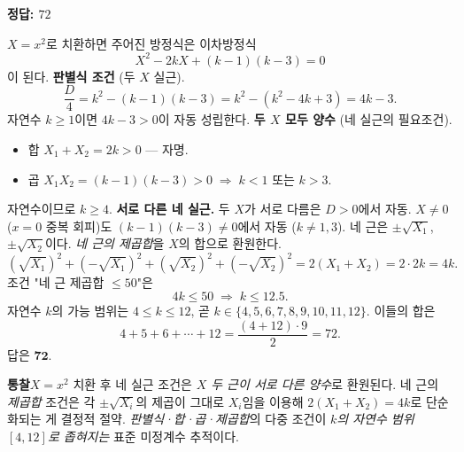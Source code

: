 \documentclass[10pt]{article}
\newcommand{\solnote}[1]{\par\smallskip\noindent
  \begin{tcolorbox}[enhanced, breakable, colback=vB-light, colframe=vB-light,
    boxrule=0pt, arc=3pt, left=10pt, right=10pt, top=4pt, bottom=4pt,
    fontupper=\sffamily\footnotesize\color{vB-ink}]
    \textbf{\color{vB-deep}통찰}\quad #1
  \end{tcolorbox}}
\begin{document}
\begin{answerbox}\sffamily\bfseries 정답: $72$\end{answerbox}
 $X = x^2$로 치환하면 주어진 방정식은 이차방정식
\[ X^2 - 2kX + (k - 1)(k - 3) = 0 \]
이 된다.
 \textbf{판별식 조건} (두 $X$ 실근).
\[ \frac{D}{4} = k^2 - (k - 1)(k - 3) = k^2 - (k^2 - 4k + 3) = 4k - 3. \]
자연수 $k \ge 1$이면 $4k - 3 > 0$이 자동 성립한다.
 \textbf{두 $X$ 모두 양수} (네 실근의 필요조건).
\begin{itemize}\setlength{\itemsep}{0pt}
\item 합 $X_1 + X_2 = 2k > 0$ — 자명.
\item 곱 $X_1 X_2 = (k - 1)(k - 3) > 0 \;\Longrightarrow\; k < 1 \text{ 또는 } k > 3$.
\end{itemize}
자연수이므로 $k \ge 4$.
 \textbf{서로 다른 네 실근.} 두 $X$가 서로 다름은 $D > 0$에서 자동. $X \ne 0$ ($x = 0$ 중복 회피)도 $(k - 1)(k - 3) \ne 0$에서 자동 ($k \ne 1, 3$).
 네 근은 $\pm \sqrt{X_1}$, $\pm \sqrt{X_2}$이다. \emph{네 근의 제곱합}을 $X$의 합으로 환원한다.
\[ (\sqrt{X_1})^2 + (-\sqrt{X_1})^2 + (\sqrt{X_2})^2 + (-\sqrt{X_2})^2 = 2(X_1 + X_2) = 2 \cdot 2k = 4k. \]
 조건 "네 근 제곱합 $\le 50$"은
\[ 4k \le 50 \;\Longrightarrow\; k \le 12.5. \]
 자연수 $k$의 가능 범위는 $4 \le k \le 12$, 곧 $k \in \{4, 5, 6, 7, 8, 9, 10, 11, 12\}$.
 이들의 합은
\[ 4 + 5 + 6 + \cdots + 12 = \frac{(4 + 12) \cdot 9}{2} = 72. \]
답은 $\textbf{72}$.
\solnote{$X = x^2$ 치환 후 네 실근 조건은 \emph{$X$ 두 근이 서로 다른 양수}로 환원된다. 네 근의 \emph{제곱합} 조건은 각 $\pm\sqrt{X_i}$의 제곱이 그대로 $X_i$임을 이용해 $2(X_1 + X_2) = 4k$로 단순화되는 게 결정적 절약. \emph{판별식·합·곱·제곱합}의 다중 조건이 \emph{$k$의 자연수 범위 $[4, 12]$로 좁혀지는} 표준 미정계수 추적이다.}
\end{document}
